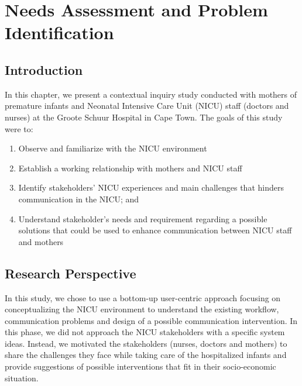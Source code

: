 
\chapter{Needs Assessment and Problem Identification } %

\label{Chapter4} %


\section{Introduction}
In this chapter, we present a contextual inquiry study conducted with mothers of premature infants and Neonatal Intensive Care Unit (NICU) staff (doctors and nurses) at the Groote Schuur Hospital in Cape Town.  The goals of this study were to:
\begin{enumerate}
      \item Observe and familiarize with the NICU environment
       \item Establish a working relationship with mothers and NICU staff
        \item Identify stakeholders' NICU experiences and main challenges that hinders communication in the NICU; and
         \item Understand stakeholder's needs and requirement regarding a  possible solutions that could be used to enhance communication between NICU staff and mothers 
\end{enumerate}

\section{Research Perspective}
In this study, we chose to use a bottom-up user-centric approach \citep{Abras2004, Balaam2015} focusing on conceptualizing the NICU environment to understand the existing workflow, communication problems and design of a possible communication intervention. In this phase, we did not approach the NICU stakeholders with a specific system ideas. Instead, we motivated the stakeholders (nurses, doctors and mothers) to share the challenges they face while taking care of the hospitalized infants and provide suggestions of possible interventions that fit in their socio-economic situation.

